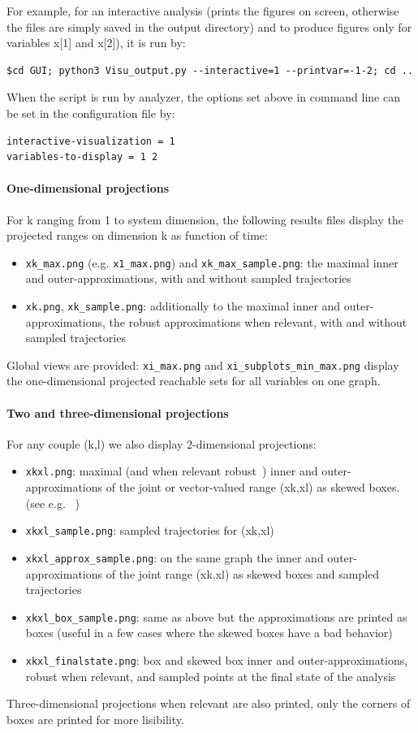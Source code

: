 \documentclass{article}
\begin{document}
For example, for an interactive analysis (prints the figures on screen, otherwise the files are simply saved in the output directory) and to produce figures only for variables x[1] and x[2]),  it is run by:
\begin{verbatim}
$cd GUI; python3 Visu_output.py --interactive=1 --printvar=-1-2; cd ..
\end{verbatim}
When the script is run by analyzer, the options set above in command line can be set in the configuration file by: 
\begin{verbatim}
interactive-visualization = 1
variables-to-display = 1 2
\end{verbatim}
\paragraph{One-dimensional projections}
For k ranging from 1 to system dimension, the following results files display the projected ranges on dimension k as function of time:
\begin{itemize}[noitemsep]
\item \texttt{xk\_max.png}  (e.g.  \texttt{x1\_max.png})  and \texttt{xk\_max\_sample.png}: the maximal inner and outer-approximations, with and without sampled trajectories
\item \texttt{xk.png},  \texttt{xk\_sample.png}: additionally to the maximal inner and outer-approximations, the robust approximations when relevant, with and without sampled trajectories
\end{itemize}
Global views are provided: \texttt{xi\_max.png} and \texttt{xi\_subplots\_min\_max.png} display the one-dimensional projected reachable sets for all variables on one graph. 

\paragraph{Two and three-dimensional projections}
For any couple (k,l) we also display 2-dimensional projections:
\begin{itemize}[noitemsep]
\item \texttt{xkxl.png}:  maximal (and when relevant robust~\cite{hscc19}) inner and outer-approximations of the joint or vector-valued range (xk,xl) as skewed boxes. (see e.g. ~\cite{lcss2020})
\item \texttt{xkxl\_sample.png}: sampled trajectories for (xk,xl) 
\item \texttt{xkxl\_approx\_sample.png}: on the same graph the inner and outer-approximations of the joint range (xk,xl) as skewed boxes and sampled trajectories
\item \texttt{xkxl\_box\_sample.png}: same as above but the approximations are printed as boxes (useful in a few cases where the skewed boxes have a bad behavior)
\item \texttt{xkxl\_finalstate.png}: box and skewed box inner and outer-approximations, robust when relevant, and sampled points at the final state of the analysis
\end{itemize}
Three-dimensional projections when relevant are also printed, only the corners of boxes are printed for more lisibility.
\end{document}
